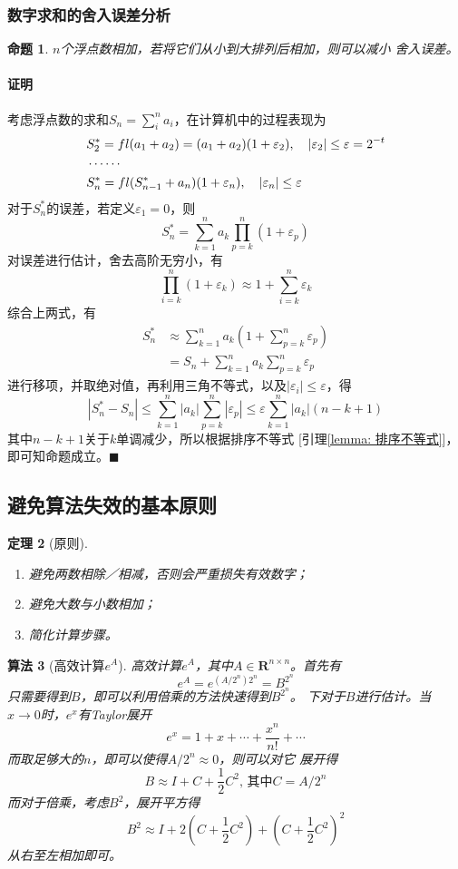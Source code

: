 \documentclass[12pt, a4paper]{article}
\theoremstyle{margin}
\newtheorem{thm}{定理}
\newtheorem{pos}[thm]{命题}
\newtheorem{alg}[thm]{算法}
\newcommand{\fl}{\mathnormal{fl}}
\newcommand{\R}{\mathbf{R}}
\newcommand{\str}{^*}
\newcommand{\vep}{\varepsilon}
\newcommand\lemmaref[1]{引理\ref{#1}}
\newcommand{\proof}{\paragraph{证明}}
\begin{document}
\subsubsection{数字求和的舍入误差分析}
  \begin{pos}
    $n$个浮点数相加，若将它们从小到大排列后相加，则可以减小
    舍入误差。
  \end{pos}
  \proof
    考虑浮点数的求和$S_n=\sum_i^n a_i$，在计算机中的过程表现为
    \[\begin{split}
      & S_2^* = \fl(a_1+a_2)=(a_1+a_2)(1+\vep_2),\quad|\vep_2|\le\vep=2^{-t}\\
      & \cdots\cdots\\
      & S_n^* = \fl(S_{n-1}^*+a_n)(1+\vep_n),\quad|\vep_n|\le\vep
    \end{split}\]
    对于$S_n\str$的误差，若定义$\vep_1=0$，则
    \[
      S_n\str=\sum_{k=1}^n a_k\prod_{p=k}^n(1+\vep_p)
    \]
    对误差进行估计，舍去高阶无穷小，有
    \[
      \prod_{i=k}^n(1+\vep_k)\approx1+\sum_{i=k}^n\vep_k
    \]
    综合上两式，有
    \[\begin{split}
      S_n\str & \approx\sum_{k=1}^na_k(1+\sum_{p=k}^n\vep_p)\\
      & = S_n + \sum_{k=1}^na_k\sum_{p=k}^n\vep_p
    \end{split}\]
    进行移项，并取绝对值，再利用三角不等式，以及$|\vep_i|\le\vep$，得
    \[
      \left|S_n\str-S_n\right|
      \le \sum_{k=1}^n|a_k|\sum_{p=k}^n|\vep_p|
      \le \vep\sum_{k=1}^n|a_k|(n-k+1)
    \]
    其中$n-k+1$关于$k$单调减少，所以根据排序不等式
    [\lemmaref{lemma: 排序不等式}]，即可知命题成立。$\blacksquare$

\newpage
\subsection{避免算法失效的基本原则}
  \begin{thm}[原则]
    $\,$
    \begin{enumerate}
      \item 避免两数相除／相减，否则会严重损失有效数字；
      \item 避免大数与小数相加；
      \item 简化计算步骤。
    \end{enumerate}
  \end{thm}


  \begin{alg}[高效计算$e^A$]
    高效计算$e^A$，其中$A\in\R^{n\times n}$。首先有
    \[
      e^A = e^{(A/2^n)2^n} = B^{2^n}
    \]
    只需要得到$B$，即可以利用倍乘的方法快速得到$B^{2^n}$。
    下对于$B$进行估计。当$x\to0$时，$e^x$有Taylor展开
    \[
      e^x = 1 + x + \cdots + \frac{x^n}{n!} + \cdots
    \]
    而取足够大的$n$，即可以使得$A/2^n\approx0$，则可以对它
    展开得
    \[
      B \approx I + C + \frac{1}{2}C^2,\,\text{其中}
      C = A/2^n
    \]
    而对于倍乘，考虑$B^2$，展开平方得
    \[
      B^2 \approx I + 2(C+\frac{1}{2}C^2) + (C+\frac{1}{2}C^2)^2
    \]
    从右至左相加即可。
  \end{alg}
\end{document}
